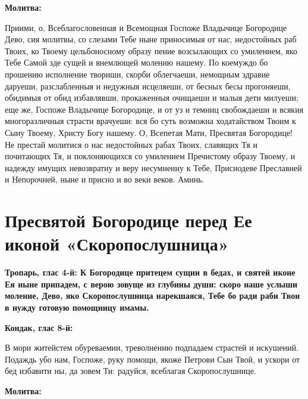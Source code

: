 \medskip


\bfseries Молитва:\normalfont{}


Приими, о, Всеблагословенная и Всемощная Госпоже Владычице Богородице Дево, сия молитвы, со слезами Тебе ныне приносимыя от нас, недостойных раб Твоих, ко Твоему цельбоносному образу пение возсылающих со умилением, яко Тебе Самой зде сущей и внемлющей молению нашему. По коемуждо бо прошению исполнение твориши, скорби облегчаеши, немощным здравие даруеши, разслабленныя и недужныя исцеляеши, от бесных бесы прогоняеши, обидимыя от обид избавлявши, прокаженныя очищаеши и малыя дети милуеши; еще же, Госпоже Владычице Богородице, и от уз и темниц свобождаеши и всякия многоразличныя страсти врачуеши: вся бо суть возможна ходатайством Твоим к Сыну Твоему, Христу Богу нашему. О, Всепетая Мати, Пресвятая Богородице! Не престай молитися о нас недостойных рабах Твоих, славящих Тя и почитающих Тя, и поклоняющихся со умилением Пречистому образу Твоему, и надежду имущих невозвратну и веру несумненну к Тебе, Приснодеве Преславней и Непорочней, ныне и присно и во веки веков. Аминь.


\section{Пресвятой Богородице перед Ее иконой «Скоропослушница»}
 
\bfseries Тропарь, глас 4-й:\normalfont{}
К Богородице притецем сущии в бедах, и святей иконе Ея ныне припадем, с верою зовуще из глубины души: скоро наше услыши моление, Дево, яко Скоропослушница нарекшаяся, Тебе бо ради раби Твои в нужду готовую помощницу имамы.


\medskip
\bfseries Кондак, глас 8-й:\normalfont{}


В мори житейстем обуреваемии, треволнению подпадаем страстей и искушений. Подаждь убо нам, Госпоже, руку помощи, якоже Петрови Сын Твой, и ускори от бед избавити ны, да зовем Ти: радуйся, всеблагая Скоропослушнице.


\medskip
\bfseries Молитва:\normalfont{}


